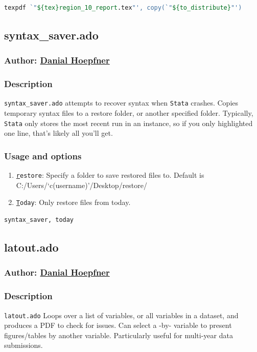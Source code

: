 \documentclass[11pt]{article}
\begin{document}
{\begin{lstlisting}[language=Stata, numbers=none]
texpdf `"${tex}region_10_report.tex"', copy(`"${to_distribute}"')
\end{lstlisting}

\subsection{syntax\_saver.ado}
\subsubsection{Author: \href{mailto:dhoepfner@gibsonconsult.com}{Danial Hoepfner}}
\subsubsection{Description}
\texttt{syntax\_saver.ado} attempts to recover syntax when \texttt{Stata} crashes. Copies temporary syntax files to a restore folder, or another specified folder. Typically, \texttt{Stata} only stores the most recent run in an instance, so if you only highlighted one line, that's likely all you'll get.
\subsubsection{Usage and options}
\begin{enumerate}
\item \texttt{\underline{r}estore}: Specify a folder to save restored files to. Default is C:/Users/`c(username)'/Desktop/restore/
\item \texttt{\underline{T}oday}: Only restore files from today.
\end{enumerate}

\begin{lstlisting}[language=Stata, numbers=none]
syntax_saver, today
\end{lstlisting}


\subsection{latout.ado}
\subsubsection{Author: \href{mailto:dhoepfner@gibsonconsult.com}{Danial Hoepfner}}
\subsubsection{Description}
\texttt{latout.ado} Loops over a list of variables, or all variables in a dataset, and produces a PDF to check for issues. Can select a -by- variable to present figures/tables by another variable. Particularly useful for multi-year data submissions.
}
\end{document}
